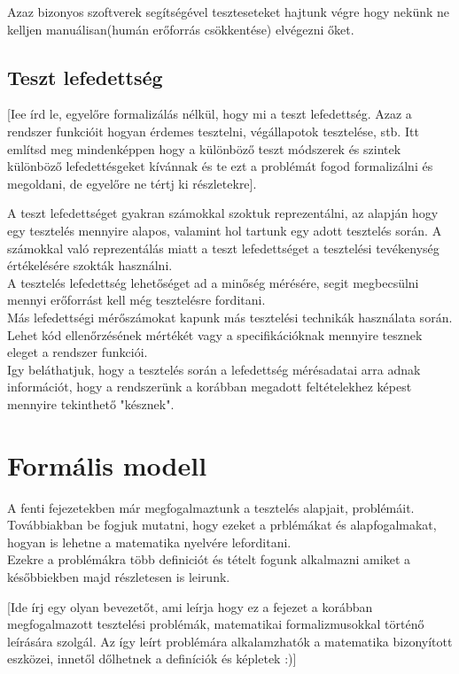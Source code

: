 \documentclass[12pt]{article}
\begin{document}
Azaz bizonyos szoftverek segítségével teszteseteket hajtunk végre hogy nekünk ne kelljen manuálisan(humán erőforrás csökkentése) elvégezni őket. 

\subsection{Teszt lefedettség}
[Iee írd le, egyelőre formalizálás nélkül, hogy mi a teszt lefedettség. Azaz a rendszer funkcióit hogyan érdemes tesztelni, végállapotok tesztelése, stb. Itt említsd meg mindenképpen hogy a különböző teszt módszerek és szintek különböző lefedettésgeket kívánnak és te ezt a problémát fogod formalizálni és megoldani, de egyelőre ne tértj ki részletekre].


A teszt lefedettséget gyakran számokkal szoktuk reprezentálni, az alapján hogy egy tesztelés mennyire alapos, valamint hol tartunk egy adott tesztelés során. A számokkal való reprezentálás miatt a teszt lefedettséget a tesztelési tevékenység értékelésére szokták használni.\\
A tesztelés lefedettség lehetőséget ad a minőség mérésére, segit megbecsülni mennyi erőforrást kell még tesztelésre forditani.\\
Más lefedettségi mérőszámokat kapunk más tesztelési technikák használata során. Lehet kód ellenőrzésének mértékét vagy a specifikációknak mennyire tesznek eleget a rendszer funkciói.\\
Igy beláthatjuk, hogy a tesztelés során a lefedettség mérésadatai arra adnak információt, hogy a rendszerünk a korábban megadott feltételekhez képest mennyire tekinthető "késznek".

\section{Formális modell}

A fenti fejezetekben már megfogalmaztunk a tesztelés alapjait, problémáit. Továbbiakban be fogjuk mutatni, hogy ezeket a prblémákat és alapfogalmakat, hogyan is lehetne a matematika nyelvére leforditani.\\
Ezekre a problémákra több definiciót és tételt fogunk alkalmazni amiket a későbbiekben majd részletesen is leirunk.  

[Ide írj egy olyan bevezetőt, ami leírja hogy ez a fejezet a korábban megfogalmazott tesztelési problémák, matematikai formalizmusokkal történő leírására szolgál. Az így leírt problémára alkalamzhatók a matematika bizonyított eszközei, innetől dőlhetnek a definíciók és képletek :)]
\end{document}
